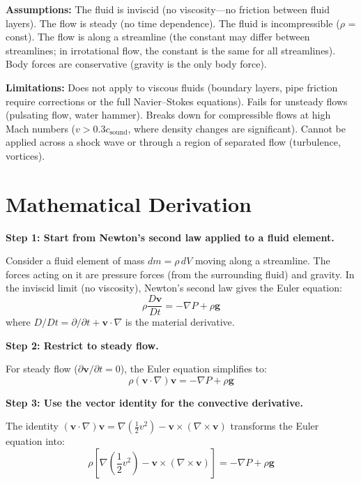 \textbf{Assumptions:} The fluid is inviscid (no viscosity---no friction between fluid layers). The flow is steady (no time dependence). The fluid is incompressible ($\rho$ = const). The flow is along a streamline (the constant may differ between streamlines; in irrotational flow, the constant is the same for all streamlines). Body forces are conservative (gravity is the only body force).


\textbf{Limitations:} Does not apply to viscous fluids (boundary layers, pipe friction require corrections or the full Navier--Stokes equations). Fails for unsteady flows (pulsating flow, water hammer). Breaks down for compressible flows at high Mach numbers ($v > 0.3c_{\text{sound}}$, where density changes are significant). Cannot be applied across a shock wave or through a region of separated flow (turbulence, vortices).


\section*{Mathematical Derivation}

\textbf{Step 1: Start from Newton's second law applied to a fluid element.}

Consider a fluid element of mass $dm = \rho\,dV$ moving along a streamline. The forces acting on it are pressure forces (from the surrounding fluid) and gravity. In the inviscid limit (no viscosity), Newton's second law gives the Euler equation:
\begin{equation}
\rho\frac{D\mathbf{v}}{Dt} = -\nabla P + \rho\mathbf{g}
\end{equation}
where $D/Dt = \partial/\partial t + \mathbf{v}\cdot\nabla$ is the material derivative.

\textbf{Step 2: Restrict to steady flow.}

For steady flow ($\partial\mathbf{v}/\partial t = 0$), the Euler equation simplifies to:
\begin{equation}
\rho(\mathbf{v}\cdot\nabla)\mathbf{v} = -\nabla P + \rho\mathbf{g}
\end{equation}

\textbf{Step 3: Use the vector identity for the convective derivative.}

The identity $(\mathbf{v}\cdot\nabla)\mathbf{v} = \nabla(\frac{1}{2}v^2) - \mathbf{v}\times(\nabla\times\mathbf{v})$ transforms the Euler equation into:
\begin{equation}
\rho\left[\nabla\left(\frac{1}{2}v^2\right) - \mathbf{v}\times(\nabla\times\mathbf{v})\right] = -\nabla P + \rho\mathbf{g}
\end{equation}

